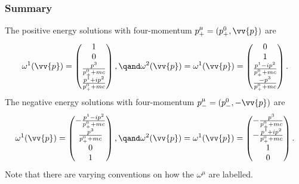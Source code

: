 \documentclass[fleqn]{NotesClass}
\begin{document}
\begin{appendices}
        \subsubsection{Summary}
        The positive energy solutions with four-momentum \(p^\mu_+ = (p^0_+, \vv{p})\) are
        \begin{equation}
            \omega^1(\vv{p}) =
            \begin{pmatrix}
                1\\ 0\\
                \frac{p^3}{p^0_+ + mc}\\
                \frac{p^1 + ip^2}{p^0_+ + mc}
            \end{pmatrix}
            ,\qand \omega^2(\vv{p}) = 
            \omega^1(\vv{p}) =
            \begin{pmatrix}
                0\\ 1\\
                \frac{p^1 - ip^2}{p^0_+ + mc}\\
                \frac{-p^3}{p^0_+ + mc}
            \end{pmatrix}
            .
        \end{equation}
        The negative energy solutions with four-momentum \(p^\mu_- = (p^0_-, -\vv{p})\) are
        \begin{equation}
            \omega^1(\vv{p}) =
            \begin{pmatrix}
                -\frac{p^1 - ip^2}{p^0_+ + mc}\\
                \frac{p^3}{p^0_+ + mc}\\
                0\\ 1
            \end{pmatrix}
            ,\qand \omega^2(\vv{p}) = 
            \omega^1(\vv{p}) =
            \begin{pmatrix}
                -\frac{p^3}{p^0_+ + mc}\\
                -\frac{p^1 + ip^2}{p^0_+ + mc}\\
                1\\ 0
            \end{pmatrix}
            .
        \end{equation}
        Note that there are varying conventions on how the \(\omega^\mu\) are labelled.
        

\end{appendices}
\end{document}
